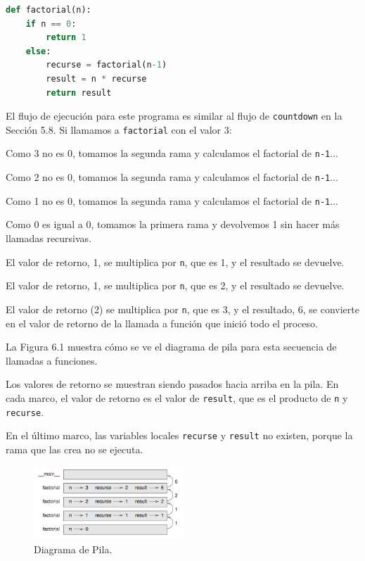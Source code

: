 \begin{lstlisting}[language=Python]
def factorial(n):
    if n == 0:
        return 1
    else:
        recurse = factorial(n-1)
        result = n * recurse
        return result
\end{lstlisting}

El flujo de ejecución para este programa es similar al flujo de \texttt{countdown} en la Sección 5.8. Si llamamos a \texttt{factorial} con el valor 3:

Como 3 no es 0, tomamos la segunda rama y calculamos el factorial de \texttt{n-1}...

Como 2 no es 0, tomamos la segunda rama y calculamos el factorial de \texttt{n-1}...

Como 1 no es 0, tomamos la segunda rama y calculamos el factorial de \texttt{n-1}...

Como 0 es igual a 0, tomamos la primera rama y devolvemos 1 sin hacer más llamadas recursivas.

El valor de retorno, 1, se multiplica por \texttt{n}, que es 1, y el resultado se devuelve.

El valor de retorno, 1, se multiplica por \texttt{n}, que es 2, y el resultado se devuelve.

El valor de retorno (2) se multiplica por \texttt{n}, que es 3, y el resultado, 6, se convierte en el valor de retorno de la llamada a función que inició todo el proceso.

La Figura 6.1 muestra cómo se ve el diagrama de pila para esta secuencia de llamadas a funciones.

Los valores de retorno se muestran siendo pasados hacia arriba en la pila. En cada marco, el valor de retorno es el valor de \texttt{result}, que es el producto de \texttt{n} y \texttt{recurse}.

En el último marco, las variables locales \texttt{recurse} y \texttt{result} no existen, porque la rama que las crea no se ejecuta.

\begin{figure}[h]
        \centering
        \includegraphics[width=0.5\textwidth]{./images/chapter_6_1.png}
        \caption{Diagrama de Pila.}
        \label{fig:6_1}
        \end{figure}
